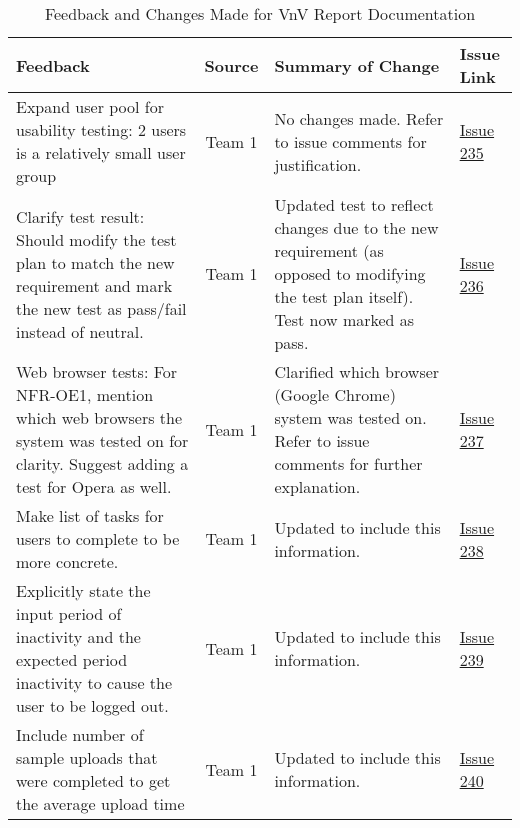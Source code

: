 \documentclass{article}
\begin{document}
\begin{table}[H]
\centering
\begin{tabularx}{\textwidth}{|X|c|X|p{1.5cm}|}
    \hline
    \textbf{Feedback} & \textbf{Source} & \textbf{Summary of Change}
    & \textbf{Issue Link} \\
    \hline
    Expand user pool for usability testing: 2 users is a relatively small user
    group & Team 1 & No changes made. Refer to issue comments for justification.
    & \href{https://github.com/SumanyaG/Alkalytics/issues/235}{Issue 235} \\
    \hline
    Clarify test result: Should modify the test plan to match the new
    requirement and mark the new test as pass/fail instead of neutral. & Team 1
    & Updated test to reflect changes due to the new requirement (as opposed to
    modifying the test plan itself). Test now marked as pass. &
    \href{https://github.com/SumanyaG/Alkalytics/issues/236}{Issue 236} \\
    \hline
    Web browser tests: For NFR-OE1, mention which web browsers the system was
    tested on for clarity. Suggest adding a test for Opera as well. & Team 1 &
    Clarified which browser (Google Chrome) system was tested on. Refer to issue
    comments for further explanation. &
    \href{https://github.com/SumanyaG/Alkalytics/issues/237}{Issue 237} \\
    \hline
    Make list of tasks for users to complete to be more concrete. & Team 1 &
    Updated to include this information. &
    \href{https://github.com/SumanyaG/Alkalytics/issues/238}{Issue 238} \\ 
    \hline
    Explicitly state the input period of inactivity and the expected period
    inactivity to cause the user to be logged out. & Team 1 & Updated to include
    this information. &
    \href{https://github.com/SumanyaG/Alkalytics/issues/239}{Issue 239} \\
    \hline
    Include number of sample uploads that were completed to get the average
    upload time & Team 1 & Updated to include this information. &
    \href{https://github.com/SumanyaG/Alkalytics/issues/240}{Issue 240} \\
    \hline
\end{tabularx}
\caption{Feedback and Changes Made for VnV Report Documentation}
\label{table:VnV2}
\end{table}
\end{document}
